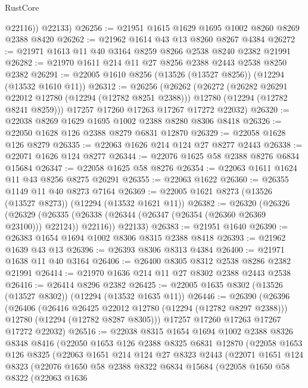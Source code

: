 \begin{lexlean}{RustCore}
\begin{coremodule}
          @22116))
      @22133)
@26256 := @21951 @1615 @1629 @1695 @1002 @8260 @8269 @2388 @8420
@26262 := @21962 @1614 @43 @13 @8260 @8267 @4384
@26272 := @21971 @1613 @11 @40 @3164 @8259 @8266 @2538 @8240 @2382 @21991
@26282 := @21970 @1611 @214 @11 @27 @8256 @2388 @2443 @2538 @8250 @2382
@26291 := @22005 @1610 @8256 (@13526 (@13527 @8256)) (@12294 (@13532 @1610 @11))
@26312 := @26256
    (@26262
      (@26272
        (@26282 @26291 @22012 @12780 (@12294 (@12782 @8251 @2388)))
        @12780
        (@12294 (@12782 @8241 @8259)))
      @17257
      @17260
      @17263
      @17267
      @17272
      @22032)
@26320 := @22038 @8269 @1629 @1695 @1002 @2388 @8280 @8306 @8418
@26326 := @22050 @1628 @126 @2388 @8279 @6831 @12870
@26329 := @22058 @1628 @126 @8279
@26335 := @22063 @1626 @214 @124 @27 @8277 @2443
@26338 := @22071 @1626 @124 @8277
@26344 := @22076 @1625 @58 @2388 @8276 @6834 @15684
@26347 := @22058 @1625 @58 @8276
@26354 := @22063 @1611 @1624 @11 @43 @8256 @8275 @26291
@26355 := @22063 @1622
@26360 := @26355 @1149 @11 @40 @8273 @7164
@26369 := @22005 @1621 @8273 (@13526 (@13527 @8273)) (@12294 (@13532 @1621 @11))
@26382 := @26320
    (@26326
      (@26329 (@26335 (@26338 (@26344 (@26347 (@26354 (@26360 @26369 @23100))) @22124)) @22116))
      @22133)
@26383 := @21951 @1640
@26390 := @26383 @1654 @1694 @1002 @8306 @8315 @2388 @8418
@26393 := @21962 @1639 @43 @13
@26396 := @26393 @8306 @8313 @4384
@26400 := @21971 @1638 @11 @40 @3164
@26406 := @26400 @8305 @8312 @2538 @8286 @2382 @21991
@26414 := @21970 @1636 @214 @11 @27 @8302 @2388 @2443 @2538
@26416 := @26414 @8296 @2382
@26425 := @22005 @1635 @8302 (@13526 (@13527 @8302)) (@12294 (@13532 @1635 @11))
@26446 := @26390
    (@26396
      (@26406
        (@26416 @26425 @22012 @12780 (@12294 (@12782 @8297 @2388)))
        @12780
        (@12294 (@12782 @8287 @8305)))
      @17257
      @17260
      @17263
      @17267
      @17272
      @22032)
@26516 := @22038
    @8315
    @1654
    @1694
    @1002
    @2388
    @8326
    @8348
    @8416
    (@22050
      @1653
      @126
      @2388
      @8325
      @6831
      @12870
      (@22058
        @1653
        @126
        @8325
        (@22063
          @1651
          @214
          @124
          @27
          @8323
          @2443
          (@22071
            @1651
            @124
            @8323
            (@22076
              @1650
              @58
              @2388
              @8322
              @6834
              @15684
              (@22058
                @1650
                @58
                @8322
                (@22063
                  @1636

\end{coremodule}
\end{lexlean}
